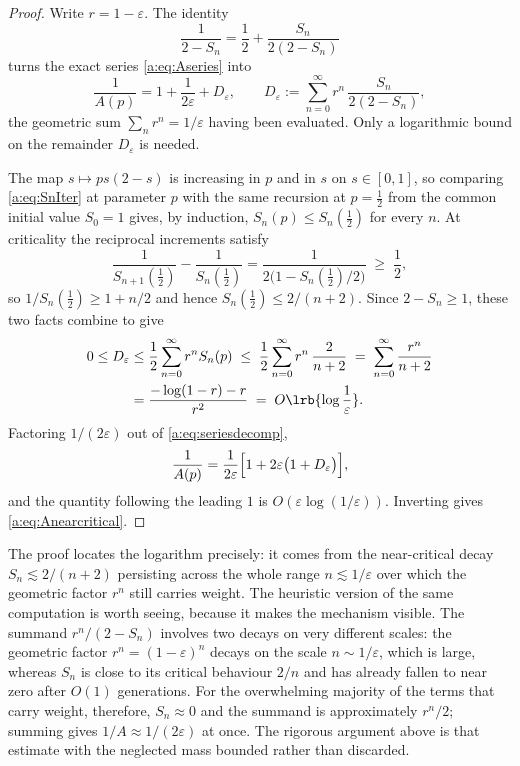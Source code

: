 \begin{proof}
Write $r = 1-\varepsilon$. The identity
\begin{equation}
\label{a:eq:denomsplit}
\frac{1}{2-S_n} = \frac12 + \frac{S_n}{2(2-S_n)}
\end{equation}
turns the exact series \cref{a:eq:Aseries} into
\begin{equation}
\label{a:eq:seriesdecomp}
\frac{1}{A(p)} = 1 + \frac{1}{2\varepsilon} + D_\varepsilon,
\qquad
D_\varepsilon := \sum_{n=0}^{\infty}r^n\,\frac{S_n}{2(2-S_n)} ,
\end{equation}
the geometric sum $\sum_nr^n = 1/\varepsilon$ having been evaluated. Only a
logarithmic bound on the remainder $D_\varepsilon$ is needed.

The map $s\mapsto ps(2-s)$ is increasing in $p$ and in $s$ on $s\in[0,1]$, so
comparing \cref{a:eq:SnIter} at parameter $p$ with the same recursion at $p=\tfrac12$
from the common initial value $S_0=1$ gives, by induction,
$S_n(p)\le S_n(\tfrac12)$ for every $n$. At criticality the reciprocal increments
satisfy
\begin{equation}
\label{a:eq:recipincrement}
\frac{1}{S_{n+1}(\tfrac12)}-\frac{1}{S_n(\tfrac12)}
= \frac{1}{2\bigl(1-S_n(\tfrac12)/2\bigr)}\;\ge\;\frac12 ,
\end{equation}
so $1/S_n(\tfrac12)\ge1+n/2$ and hence $S_n(\tfrac12)\le2/(n+2)$. Since
$2-S_n\ge1$, these two facts combine to give
\begin{align}
0\le D_\varepsilon
&\le \frac12\sum_{n=0}^{\infty}r^nS_n(p)
 \;\le\; \frac12\sum_{n=0}^{\infty}r^n\,\frac{2}{n+2}
 \;=\; \sum_{n=0}^{\infty}\frac{r^n}{n+2}
\notag\\
&= \frac{-\log(1-r)-r}{r^2}
 \;=\; O\lrb{\log\frac1\varepsilon} .
\label{a:eq:Dbound}
\end{align}
Factoring $1/(2\varepsilon)$ out of \cref{a:eq:seriesdecomp},
\begin{equation*}
\frac{1}{A(p)} = \frac{1}{2\varepsilon}
\Bigl[1 + 2\varepsilon\bigl(1+D_\varepsilon\bigr)\Bigr],
\end{equation*}
and the quantity following the leading $1$ is $O(\varepsilon\log(1/\varepsilon))$.
Inverting gives \cref{a:eq:Anearcritical}.
\end{proof}

The proof locates the logarithm precisely: it comes from the near-critical decay
$S_n\lesssim2/(n+2)$ persisting across the whole range $n\lesssim1/\varepsilon$ over
which the geometric factor $r^n$ still carries weight. The heuristic version of the
same computation is worth seeing, because it makes the mechanism visible. The
summand $r^n/(2-S_n)$ involves two decays on very different scales: the geometric
factor $r^n = (1-\varepsilon)^n$ decays on the scale $n\sim1/\varepsilon$, which is
large, whereas $S_n$ is close to its critical behaviour $2/n$ and has already
fallen to near zero after $O(1)$ generations. For the overwhelming majority of the
terms that carry weight, therefore, $S_n\approx0$ and the summand is approximately
$r^n/2$; summing gives $1/A\approx1/(2\varepsilon)$ at once. The rigorous argument
above is that estimate with the neglected mass bounded rather than discarded.

